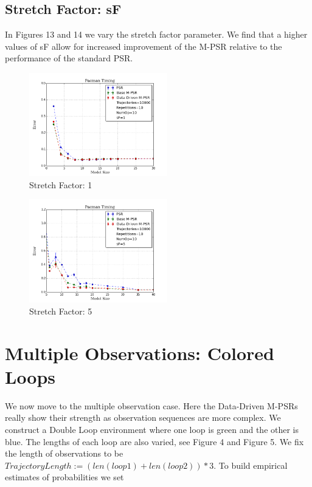 \subsection{Stretch Factor: sF}

In Figures 13 and 14 we vary the stretch factor parameter. We find that a higher values of sF allow for increased improvement of the M-PSR relative to the performance of the standard PSR.

\begin{figure}[ht!]
\centering
\includegraphics[width=60mm]{uCOREPICS/Pacman/PacmanSF=1.png}
\caption{Stretch Factor: 1\label{overflow}}
\end{figure}

\begin{figure}[ht!]
\centering
\includegraphics[width=60mm]{uCOREPICS/Pacman/PacmanSF=5.png}
\caption{Stretch Factor: 5\label{overflow}}
\end{figure}

\section{Multiple Observations: Colored Loops}

We now move to the multiple observation case. Here the Data-Driven M-PSRs really show their strength as observation sequences are more complex. We construct a Double Loop environment where one loop is green and the other is blue. The lengths of each loop are also varied, see Figure 4 and Figure 5. We fix the length of observations to be $TrajectoryLength := (len(loop1) + len(loop2))*3$. To build empirical estimates of probabilities we set

